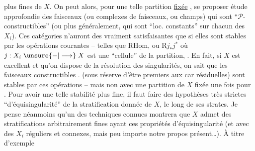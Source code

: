 plus fines de $X$. On peut alors, pour une telle partition
\uline{fixée} , se proposer  étude approfondie
 des faisceaux (ou complexes de faisceaux, ou
champs) qui sont ``$\mathcal P$-constructibles'' (ou plus
généralement, qui sont ``loc. constants'' sur
chacun des $X_i$). Ces catégories n'auront des
  vraiment satisfaisantes que si
elles sont stables par les opérations courantes
-- telles que $\mathrm R\underline{\mathrm{Hom}}$, ou $\mathrm Rj_*j^*$ où $j:X_i\mathrel{\unsure{-|\longrightarrow}}X$
est une ``cellule'' de la partition, . En fait, si
$X$ est excellent et qu'on dispose de la résolution
des singularités, on sait que les faisceaux 
constructibles . (sous réserve d'être premiers
aux car résiduelles) sont stables par  ces
opérations -- mais non avec une partition de $X$
fixée une fois pour . Pour avoir une
telle stabilité plus fine, il faut faire des
hypothèses très strictes  ``d'équisingularité''
de la stratification donnée de $X$, le long de
ses strates. Je pense néanmoins qu'un 
des techniques connues montrera que
$X$ admet des stratifications arbitrairement fines
ayant ces propriétés d'équisingularité (et avec
des $X_i$ réguliers et connexes, mais peu importe
 notre propos présent\ldots). À titre d'exemple

